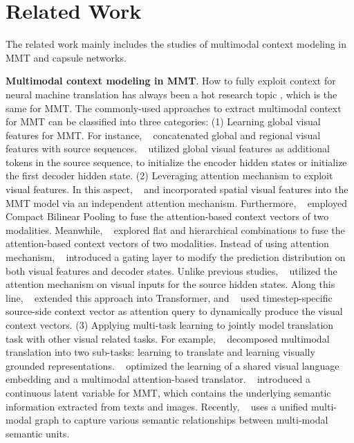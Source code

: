 \documentclass[sigconf]{acmart}
\begin{document}
\section{Related Work}
The related work mainly includes the studies of multimodal context modeling in MMT and capsule networks. 

\textbf{Multimodal context modeling in MMT}. How to fully exploit context for neural machine translation has always been a hot research topic \cite{vnmt2016,context17,context18,taslp2018,vrnmt2018,abd2018,emnlp2018,ai2019,tpami2019}, which is the same for MMT. 
The commonly-used approaches to extract multimodal context for MMT can be classified into three categories:
(1) Learning global visual features for MMT. 
For instance, 
\citeauthor{huang2016attention}~ concatenated global and regional visual features with source sequences.  \citeauthor{calixto2017incorporating}~ utilized global visual features as additional tokens in the source sequence, to initialize the encoder hidden states or initialize the first decoder hidden state. 
(2) Leveraging attention mechanism to exploit visual features.
In this aspect,
\citeauthor{caglayan2016multimodal}~ and \citeauthor{calixto2017doubly} incorporated spatial visual features into the MMT model via an independent attention mechanism. 
Furthermore,  
\citeauthor{delbrouck2017multimodal}~ employed Compact Bilinear Pooling to fuse the attention-based context vectors of two modalities. 
Meanwhile,  
\citeauthor{libovicky2017attention}~ explored flat and hierarchical combinations to fuse the attention-based context vectors of two modalities. 
Instead of using attention mechanism, \citeauthor{gronroos2018memad}~ introduced a gating layer to modify the prediction distribution on both visual features and decoder states. 
Unlike previous studies, \citeauthor{Delbrouck:NIPS17workshop}~ utilized the attention mechanism on visual inputs for the source hidden states.
Along this line, \citeauthor{arslan2018doubly}~ extended this approach into Transformer,
and
\citeauthor{helcl2018cuni}~
used timestep-specific source-side context vector as attention query to dynamically produce the visual context vectors. 
(3) Applying multi-task learning to jointly model translation task with other visual related tasks. 
For example, 
\citeauthor{elliott2017imagination}~ decomposed multimodal translation into two sub-tasks: 
learning to translate and learning visually grounded representations. \citeauthor{zhou2018visual}~ optimized the learning of a shared visual language embedding and a multimodal attention-based translator. 
\citeauthor{calixto2019latent}~ introduced a continuous latent variable for MMT, 
which contains the underlying semantic information extracted from texts and images.
Recently, \citeauthor{yyj}~ uses a unified multi-modal graph to  capture various semantic relationships between multi-modal semantic units.
\end{document}
